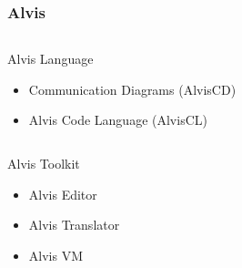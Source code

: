\documentclass{beamer}
\begin{document}
\begin{frame}
\frametitle{Alvis}

\begin{columns}
\begin{block}{Alvis Language}
\begin{itemize}
  \item Communication Diagrams (AlvisCD)
  \item Alvis Code Language (AlvisCL)
\end{itemize}
\end{block}
\end{columns}

\vspace{0.6cm}

\begin{columns}
\begin{block}{Alvis Toolkit}
\begin{itemize}
  \item Alvis Editor
  \item Alvis Translator
  \item Alvis VM
\end{itemize}
\end{block}
\end{columns}

\end{frame}

\end{document}
